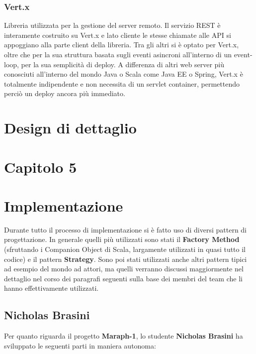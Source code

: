 	 \subsubsection{Vert.x}\label{subsub:tecnologie:vert.x}
	  Libreria utilizzata per la gestione del server remoto. Il servizio REST è interamente costruito su Vert.x e lato cliente le stesse chiamate alle API si appoggiano alla parte client della libreria.
	  Tra gli altri si è optato per Vert.x, oltre che per la sua struttura basata sugli eventi asincroni all'interno di un event-loop, per la sua semplicità di deploy. A differenza di altri web server più conosciuti all'interno del mondo Java o Scala come Java EE o Spring, Vert.x è totalmente
	  indipendente e non necessita di un servlet container, permettendo perciò un deploy ancora più immediato.
        \clearpage
    \section{Design di dettaglio}\label{sec:design:details}
    
    \clearpage
    
 \section*{\Huge {\textbf Capitolo 5}\label{chapter5}}
 
     \section{Implementazione}\label{sec:implementation}

     Durante tutto il processo di implementazione si è fatto uso di diversi pattern di progettazione. In generale quelli più utilizzati sono stati il \textbf{Factory Method} (sfruttando i Companion Object di Scala, largamente utilizzati in quasi tutto il codice) e il pattern \textbf{Strategy}. Sono poi stati utilizzati anche altri pattern tipici ad esempio del mondo ad attori, ma quelli verranno discussi maggiormente nel dettaglio nel corso dei paragrafi seguenti sulla base dei membri del team che li hanno effettivamente utilizzati.
     
        \subsection{Nicholas Brasini}\label{subsec:brasini}
        Per quanto riguarda il progetto \textbf{Maraph-1}, lo studente \textbf{Nicholas Brasini} ha sviluppato le seguenti parti in maniera autonoma:
        
